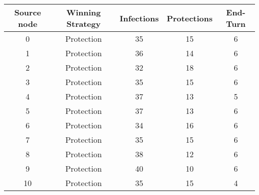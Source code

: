 \documentclass[results.tex]{subfiles}
\begin{document}
    \begin{center}
        \begin{tabular}{| c || c | c | c | c |}
            \hline
            {\bfseries Source node} & {\bfseries Winning Strategy} & {\bfseries Infections} & {\bfseries Protections}
            & {\bfseries End-Turn}
            \\  %
            \hline\hline
            0                       & Protection                   & 35                     & 15                      & 6                    \\
            \hline
            1                       & Protection                   & 36                     & 14                      & 6                    \\
            \hline
            2                       & Protection                   & 32                     & 18                      & 6                    \\
            \hline
            3                       & Protection                   & 35                     & 15                      & 6                    \\
            \hline
            4                       & Protection                   & 37                     & 13                      & 5                    \\
            \hline
            5                       & Protection                   & 37                     & 13                      & 6                    \\
            \hline
            6                       & Protection                   & 34                     & 16                      & 6                    \\
            \hline
            7                       & Protection                   & 35                     & 15                      & 6                    \\
            \hline
            8                       & Protection                   & 38                     & 12                      & 6                    \\
            \hline
            9                       & Protection                   & 40                     & 10                      & 6                    \\
            \hline
            10                      & Protection                   & 35                     & 15                      & 4                    \\

\end{tabular}
\end{center}
\end{document}
